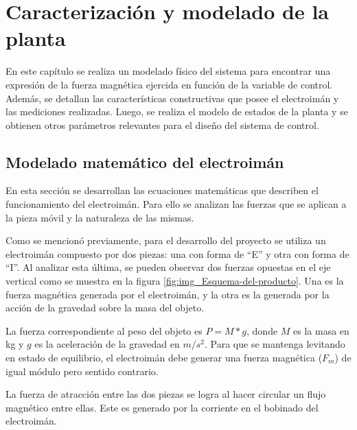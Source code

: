 \chapter{Caracterización y modelado de la planta}  \label{cap:CaracterizacionElectroiman}

En este capítulo se realiza un modelado físico del sistema para encontrar una expresión de la fuerza magnética ejercida en función de la variable de control. Además, se detallan las características constructivas que posee el electroimán y las mediciones realizadas. Luego, se realiza el modelo de estados de la planta y se obtienen otros parámetros relevantes para el diseño del sistema de control.

\section{Modelado matemático del electroimán}

En esta sección se desarrollan las ecuaciones matemáticas que describen el funcionamiento del electroimán. Para ello se analizan las fuerzas que se aplican a la pieza móvil y la naturaleza de las mismas.

Como se mencionó previamente, para el desarrollo del proyecto se utiliza un electroimán compuesto por dos piezas: una con forma de “E” y otra con forma de “I”. Al analizar esta última, se pueden observar dos fuerzas opuestas en el eje vertical como se muestra en la figura \ref{fig:img_Esquema-del-producto}. Una es la fuerza magnética generada por el electroimán, y la otra es la generada por la acción de la gravedad sobre la masa del objeto.  


\noindent La fuerza correspondiente al peso del objeto es $P=M*g$, donde $M$ es la masa en kg y $g$ es la aceleración de la gravedad en $m/s^2$. Para que se mantenga levitando en estado de equilibrio, el electroimán debe generar una fuerza magnética ($F_{m}$) de igual módulo pero sentido contrario.

\noindent La fuerza de atracción entre las dos piezas se logra al hacer circular un flujo magnético entre ellas. Este es generado por la corriente en el bobinado del electroimán.

